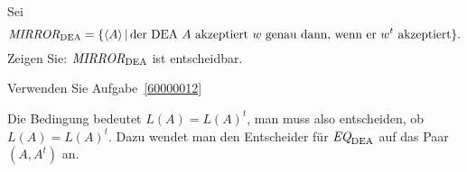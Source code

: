Sei
\[
\text{\it MIRROR}_{\text{DEA}}
= \{\langle A\rangle\,|\,
\text{der DEA $A$ akzeptiert $w$ genau dann, wenn er $w^t$ akzeptiert}\}.
\]
Zeigen Sie: $\text{\it MIRROR}_\text{DEA}$ ist entscheidbar.


\begin{hinweis}
Verwenden Sie Aufgabe~\ref{60000012}
\end{hinweis}

\begin{loesung}
Die Bedingung bedeutet $L(A)=L(A)^t$, man muss also entscheiden,
ob $L(A)=L(A)^t$. Dazu wendet man den Entscheider für
$\text{\it EQ}_{\text{DEA}}$ auf das Paar $(A,A^t)$ an.
\end{loesung}
